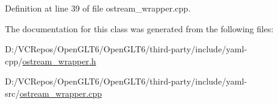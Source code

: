 Definition at line 39 of file ostream\+\_\+wrapper.\+cpp.



The documentation for this class was generated from the following files\+:\begin{DoxyCompactItemize}
\item 
D\+:/\+V\+C\+Repos/\+Open\+G\+L\+T6/\+Open\+G\+L\+T6/third-\/party/include/yaml-\/cpp/\mbox{\hyperlink{ostream__wrapper_8h}{ostream\+\_\+wrapper.\+h}}\item 
D\+:/\+V\+C\+Repos/\+Open\+G\+L\+T6/\+Open\+G\+L\+T6/third-\/party/include/yaml-\/src/\mbox{\hyperlink{ostream__wrapper_8cpp}{ostream\+\_\+wrapper.\+cpp}}\end{DoxyCompactItemize}
